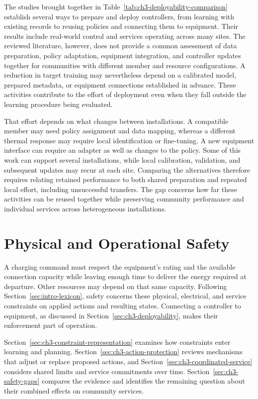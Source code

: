 The studies brought together in Table~\ref{tab:ch3-deployability-comparison} establish several ways to prepare and deploy controllers, from learning with existing records to reusing policies and connecting them to equipment. Their results include real-world control and services operating across many sites. The reviewed literature, however, does not provide a common assessment of data preparation, policy adaptation, equipment integration, and controller updates together for communities with different member and resource configurations. A reduction in target training may nevertheless depend on a calibrated model, prepared metadata, or equipment connections established in advance. These activities contribute to the effort of deployment even when they fall outside the learning procedure being evaluated.

That effort depends on what changes between installations. A compatible member may need policy assignment and data mapping, whereas a different thermal response may require local identification or fine-tuning. A new equipment interface can require an adapter as well as changes to the policy. Some of this work can support several installations, while local calibration, validation, and subsequent updates may recur at each site. Comparing the alternatives therefore requires relating retained performance to both shared preparation and repeated local effort, including unsuccessful transfers. The gap concerns how far these activities can be reused together while preserving community performance and individual services across heterogeneous installations.


\FloatBarrier
\section{Physical and Operational Safety}
\label{sec:ch3-safety}

A charging command must respect the equipment's rating and the available connection capacity while leaving enough time to deliver the energy required at departure. Other resources may depend on that same capacity. Following Section~\ref{sec:intro-lexicon}, safety concerns these physical, electrical, and service constraints on applied actions and resulting states. Connecting a controller to equipment, as discussed in Section~\ref{sec:ch3-deployability}, makes their enforcement part of operation.

Section~\ref{sec:ch3-constraint-representation} examines how constraints enter learning and planning. Section~\ref{sec:ch3-action-protection} reviews mechanisms that adjust or replace proposed actions, and Section~\ref{sec:ch3-coordinated-service} considers shared limits and service commitments over time. Section~\ref{sec:ch3-safety-gaps} compares the evidence and identifies the remaining question about their combined effects on community services.

